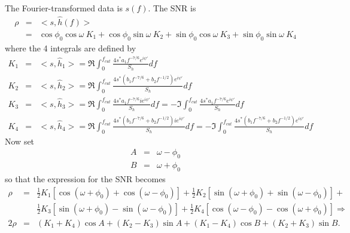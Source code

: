 The Fourier-transformed data is $s(f)$. The SNR is
\begin{eqnarray}
\rho &=& <s,\hat{h}(f)> \\  
     &=& \cos\phi_0 \cos\omega \: K_1 + 
             \cos\phi_0 \sin\omega \: K_2+ 
             \sin\phi_0 \cos\omega \: K_3 +
             \sin\phi_0 \sin\omega \: K_4
\end{eqnarray}
where the 4 integrals are defined by
\begin{eqnarray}
\label{K1}
K_1 &=& <s,\hat{h}_1>  = \Re \int_0^{f_{cut}} \frac{4 s^{\ast} a_1 f^{-7/6}
	e^{i \psi'}}{S_h} df \\ \label{K2}
K_2 &=& <s,\hat{h}_2>  = \Re \int_0^{f_{cut}} \frac{4 s^{\ast} (b_1 f^{-7/6}
         + b_2 f^{-1/2} ) e^{i \psi'}}{S_h} df \\ \label{K3}
K_3 &=& <s,\hat{h}_3>  = \Re \int_0^{f_{cut}} \frac{4 s^{\ast} a_1 f^{-7/6} i
        e^{i \psi'}}{S_h} df 
	= -\Im \int_0^{f_{cut}} \frac{4 s^{\ast} a_1 f^{-7/6} e^{i \psi'}}{S_h}
	df  \\ \label{K4}
K_4 &=& <s,\hat{h}_4>  = \Re \int_0^{f_{cut}} \frac{4 s^{\ast} (b_1 f^{-7/6}
	+ b_2 f^{-1/2} ) i e^{i \psi'}}{S_h} df 
	= -\Im \int_0^{f_{cut}} \frac{4 s^{\ast} (b_1 f^{-7/6} + b_2 f^{-1/2})
	e^{i \psi'}}{S_h} df 
\end{eqnarray}
Now set
\begin{eqnarray}
\label{OmegaMinusPhi}
A &=& \omega - \phi_0 \\
B &=& \omega + \phi_0 \label{OmegaPlusPhi}
\end{eqnarray}
so that the expression for the SNR becomes
\begin{eqnarray}
\rho &=& \frac{1}{2} K_1 [\cos(\omega+\phi_0)+\cos(\omega-\phi_0)] +
	\frac{1}{2} K_2 [\sin(\omega+\phi_0)+\sin(\omega-\phi_0)] +\\
	&& \frac{1}{2} K_3[\sin(\omega+\phi_0)-\sin(\omega-\phi_0)]
	+\frac{1}{2} K_4 [\cos(\omega-\phi_0)-\cos(\omega+\phi_0)]\Rightarrow\\
2 \rho &=& (K_1+K_4) \cos A + (K_2-K_3) \sin A + (K_1-K_4) \cos B + (K_2+K_3)
\sin B.
\label{MaxSNR}
\end{eqnarray}

